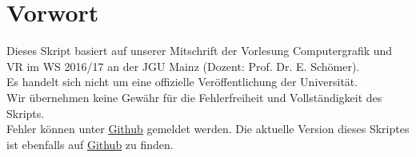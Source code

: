 \chapter{Vorwort}
Dieses Skript basiert auf unserer Mitschrift der Vorlesung Computergrafik und VR im WS 2016/17 an der JGU Mainz (Dozent: Prof. Dr. E. Schömer).\\ 
Es handelt sich nicht um eine offizielle  Veröffentlichung  der Universität.\\
Wir übernehmen keine Gewähr für die Fehlerfreiheit und Vollständigkeit des Skripts.\\
Fehler können unter \href{https://github.com/Gusser93/ComputergrafikVorlesung}{Github} gemeldet werden. Die aktuelle Version dieses Skriptes ist ebenfalls auf  \href{https://github.com/Gusser93/ComputergrafikVorlesung}{Github} zu finden.